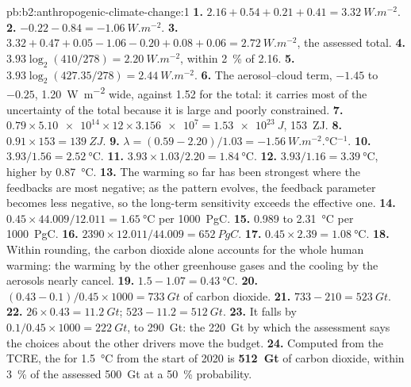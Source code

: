 \begin{solution}{pb:b2:anthropogenic-climate-change:1}
\textbf{1.} $2.16 + 0.54 + 0.21 + 0.41 = \qty{3.32}{W.m^{-2}}$.
\textbf{2.} $-0.22 - 0.84 = \qty{-1.06}{W.m^{-2}}$.
\textbf{3.} $3.32 + 0.47 + 0.05 - 1.06 - 0.20 + 0.08 + 0.06 = \qty{2.72}{W.m^{-2}}$, the assessed
total.
\textbf{4.} $3.93\log_2(410/278) = \qty{2.20}{W.m^{-2}}$, within \qty{2}{\percent} of 2.16.
\textbf{5.} $3.93\log_2(427.35/278) = \qty{2.44}{W.m^{-2}}$.
\textbf{6.} The aerosol--cloud term, $-1.45$ to $-0.25$, \qty{1.20}{W.m^{-2}} wide, against 1.52 for
the total: it carries most of the uncertainty of the total because it is large and poorly
constrained.
\textbf{7.} $0.79 \times \num{5.10e14} \times 12 \times \num{3.156e7} = \qty{1.53e23}{J}$,
\qty{153}{ZJ}.
\textbf{8.} $0.91 \times 153 = \qty{139}{ZJ}$.
\textbf{9.} $\lambda = (0.59 - 2.20)/1.03 = \qty{-1.56}{W.m^{-2}.\celsius^{-1}}$.
\textbf{10.} $3.93/1.56 = \qty{2.52}{\celsius}$.
\textbf{11.} $3.93 \times 1.03/2.20 = \qty{1.84}{\celsius}$.
\textbf{12.} $3.93/1.16 = \qty{3.39}{\celsius}$, higher by \qty{0.87}{\celsius}.
\textbf{13.} The warming so far has been strongest where the feedbacks are most negative; as the
pattern evolves, the feedback parameter becomes less negative, so the long-term sensitivity
exceeds the effective one.
\textbf{14.} $0.45 \times 44.009/12.011 = \qty{1.65}{\celsius}$ per \qty{1000}{PgC}.
\textbf{15.} 0.989 to \qty{2.31}{\celsius} per \qty{1000}{PgC}.
\textbf{16.} $2390 \times 12.011/44.009 = \qty{652}{PgC}$.
\textbf{17.} $0.45 \times 2.39 = \qty{1.08}{\celsius}$.
\textbf{18.} Within rounding, the carbon dioxide alone accounts for the whole human warming: the
warming by the other greenhouse gases and the cooling by the aerosols nearly cancel.
\textbf{19.} $1.5 - 1.07 = \qty{0.43}{\celsius}$.
\textbf{20.} $(0.43 - 0.1)/0.45 \times 1000 = \qty{733}{Gt}$ of carbon dioxide.
\textbf{21.} $733 - 210 = \qty{523}{Gt}$.
\textbf{22.} $26 \times 0.43 = \qty{11.2}{Gt}$; $523 - 11.2 = \qty{512}{Gt}$.
\textbf{23.} It falls by $0.1/0.45 \times 1000 = \qty{222}{Gt}$, to \qty{290}{Gt}: the
\qty{220}{Gt} by which the assessment says the choices about the other drivers move the budget.
\textbf{24.} Computed from the TCRE, the  for \qty{1.5}{\celsius} from the
start of 2020 is \textbf{\qty[text-series-to-math=true]{512}{Gt}} of carbon dioxide, within
\qty{3}{\percent} of the assessed \qty{500}{Gt} at a \qty{50}{\percent} probability.
\end{solution}
